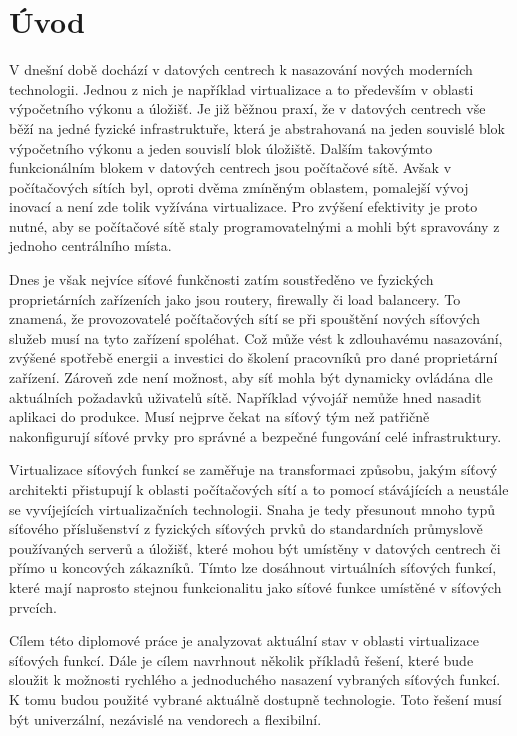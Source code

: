 
\chapter{Úvod}

V dnešní době dochází v datových centrech k nasazování nových moderních technologii. Jednou z nich je například virtualizace a to především v oblasti výpočetního výkonu a úložišť. Je již běžnou praxí, že v datových centrech vše běží na jedné fyzické infrastruktuře, která je abstrahovaná na jeden souvislé blok výpočetního výkonu a jeden souvislí blok úložiště. Dalším takovýmto funkcionálním blokem v datových centrech jsou počítačové sítě. Avšak v počítačových sítích byl, oproti dvěma zmíněným oblastem, pomalejší vývoj inovací a není zde tolik vyžívána virtualizace. Pro zvýšení efektivity je proto nutné, aby se počítačové sítě staly programovatelnými a mohli být spravovány z jednoho centrálního místa. 

Dnes je však nejvíce síťové funkčnosti zatím soustředěno ve fyzických proprietárních zařízeních jako jsou routery, firewally či load balancery. To znamená, že provozovatelé počítačových sítí se při spouštění nových síťových služeb musí na tyto zařízení spoléhat. Což může vést k zdlouhavému nasazování, zvýšené spotřebě energii a investici do školení pracovníků pro dané proprietární zařízení. Zároveň zde není možnost, aby síť mohla být dynamicky ovládána dle aktuálních požadavků uživatelů sítě. Například vývojář nemůže hned nasadit aplikaci do produkce. Musí nejprve čekat na síťový tým než patřičně nakonfigurují síťové prvky pro správné a bezpečné fungování celé infrastruktury.

Virtualizace síťových funkcí se zaměřuje na transformaci způsobu, jakým síťový architekti přistupují k oblasti počítačových sítí a to pomocí stávájících a neustále se vyvíjejících virtualizačních technologii. Snaha je tedy přesunout mnoho typů síťového příslušenství z fyzických síťových prvků do standardních průmyslově používaných serverů a úložišť, které mohou být umístěny v datových centrech či přímo u koncových zákazníků. Tímto lze dosáhnout virtuálních síťových funkcí, které mají naprosto stejnou funkcionalitu jako síťové funkce umístěné v síťových prvcích.

Cílem této diplomové práce je analyzovat aktuální stav v oblasti virtualizace síťových funkcí. Dále je cílem navrhnout několik příkladů řešení, které bude sloužit k možnosti rychlého a jednoduchého nasazení vybraných síťových funkcí. K tomu budou použité vybrané aktuálně dostupně technologie. Toto řešení musí být univerzální, nezávislé na vendorech a flexibilní.

